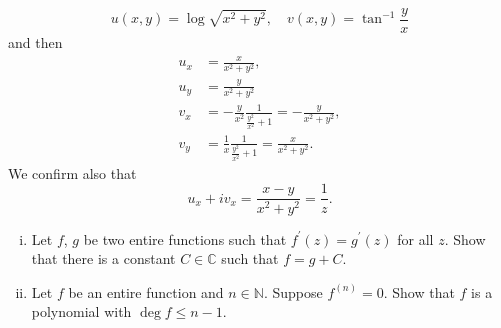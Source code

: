 \documentclass{article}
\newcounter{Problem}
\newenvironment{Problem}{\begin{Exercise}[name={Problem},
                                          counter={Problem}]}
                        {\end{Exercise}}
\begin{document}
\begin{Answer}
\begin{itemize}
{      $$
      u(x, y) = \log \sqrt{x^2 + y^2}, \quad
      v(x, y) = \tan^{-1} \frac{y}{x}
      $$
      and then
      \begin{align*}
      u_x &= \frac{x}{x^2 + y^2}, \\
      u_y &= \frac{y}{x^2 + y^2} \\
      v_x &= -\frac{y}{x^2}\frac{1}{\frac{y^2}{x^2} + 1}
           = -\frac{y}{x^2 + y^2}, \\
      v_y &= \frac{1}{x}\frac{1}{\frac{y^2}{x^2} + 1}
           = \frac{x}{x^2 + y^2}.
      \end{align*}
      We confirm also that
      $$
      u_x + i v_x = \frac{x - y}{x^2 + y^2} = \frac{1}{z}.
      $$
    }
  \end{itemize}
\end{Answer}

\begin{Problem}
  \begin{enumerate}[(i)]
    \item{
      Let $f$, $g$ be two entire functions such that
      $f^\prime(z) = g^\prime(z)$ for all $z$. Show that there is a
      constant $C \in \mathbb{C}$ such that $f = g + C$.
    }
    \item{
      Let $f$ be an entire function and $n \in \mathbb{N}$.
      Suppose $f^{(n)} = 0$. Show that $f$ is a polynomial
      with $\deg f \leq n - 1$.
    }
  \end{enumerate}
\end{Problem}
\end{document}
